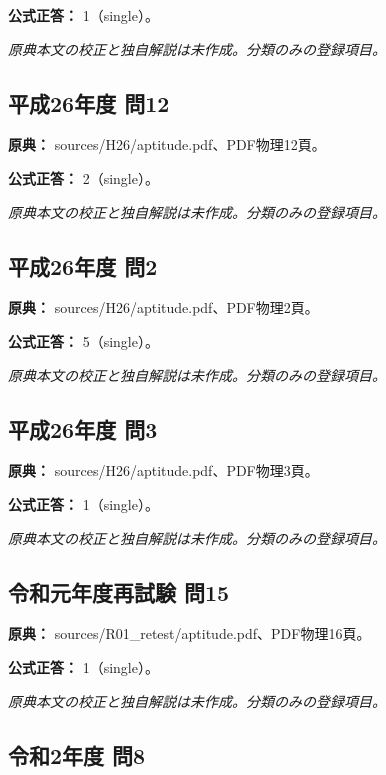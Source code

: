 \textbf{公式正答：} 1（single）。

\par\textit{原典本文の校正と独自解説は未作成。分類のみの登録項目。}

\subsection{平成26年度 問12}
\label{q:h26-reg-apt-12}

\noindent\textbf{原典：} sources/H26/aptitude.pdf、PDF物理12頁。

\textbf{公式正答：} 2（single）。

\par\textit{原典本文の校正と独自解説は未作成。分類のみの登録項目。}

\subsection{平成26年度 問2}
\label{q:h26-reg-apt-02}

\noindent\textbf{原典：} sources/H26/aptitude.pdf、PDF物理2頁。

\textbf{公式正答：} 5（single）。

\par\textit{原典本文の校正と独自解説は未作成。分類のみの登録項目。}

\subsection{平成26年度 問3}
\label{q:h26-reg-apt-03}

\noindent\textbf{原典：} sources/H26/aptitude.pdf、PDF物理3頁。

\textbf{公式正答：} 1（single）。

\par\textit{原典本文の校正と独自解説は未作成。分類のみの登録項目。}

\subsection{令和元年度再試験 問15}
\label{q:r01-ret-apt-15}

\noindent\textbf{原典：} sources/R01\_retest/aptitude.pdf、PDF物理16頁。

\textbf{公式正答：} 1（single）。

\par\textit{原典本文の校正と独自解説は未作成。分類のみの登録項目。}

\subsection{令和2年度 問8}
\label{q:r02-reg-apt-08}

